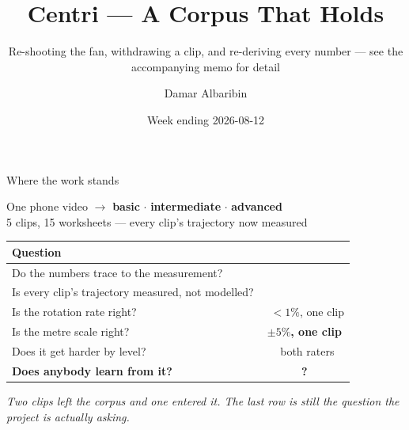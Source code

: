 \documentclass[aspectratio=169,10pt]{beamer}
\title{Centri --- A Corpus That Holds}
\subtitle{Re-shooting the fan, withdrawing a clip, and re-deriving every number ---
see the accompanying memo for detail}
\author{Damar Albaribin}
\institute{MSc Thesis --- advisor: Prof.\ Wu-Yuin Hwang}
\date{Week ending 2026-08-12}
\newcommand{\ok}{{\color{cApp}\textbf{\checkmark}}}
\newcommand{\takeaway}[1]{\vfill{\footnotesize\itshape\color{cGrey}#1\par}}
\begin{document}
\maketitle

\begin{frame}{Where the work stands}
\vfill
\begin{center}
{\Large One phone video $\rightarrow$ \textbf{\color{cBasic}basic} $\cdot$
\textbf{\color{cInter}intermediate} $\cdot$ \textbf{\color{cAdv}advanced}}\\[3pt]
{\footnotesize 5 clips, 15 worksheets --- every clip's trajectory now measured}
\end{center}
\vfill
\begin{center}
\small
\renewcommand{\arraystretch}{1.6}
\begin{tabular}{@{}p{7.4cm}c@{}}
\toprule
\rowcolor{cPed!12}
\textbf{Question} & \\
\midrule
Do the numbers trace to the measurement? & \ok \\
Is every clip's trajectory measured, not modelled? & \ok \\
Is the rotation rate right? & \ok \ {\footnotesize\color{cGrey}$<1\%$, one clip} \\
Is the metre scale right? & {\color{cPed}\textbf{$\pm5\%$, one clip}} \\
Does it get harder by level? & \ok \ {\footnotesize\color{cGrey}both raters} \\
\textbf{Does anybody learn from it?} & {\color{cAccent}\textbf{?}} \\
\bottomrule
\end{tabular}
\end{center}
\vfill
\takeaway{Two clips left the corpus and one entered it. The last row is still the question the
project is actually asking.}
\end{frame}
\end{document}

